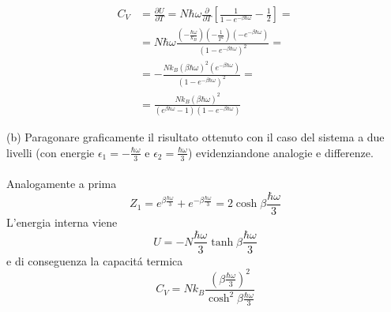 \documentclass[a4paper]{article}
\begin{document}
        \begin{equation*}
            \begin{split}
                C_V&=\frac{\partial U}{\partial T}=N\hbar\omega\frac{\partial}{\partial T}\left[\frac{1}{1-e^{-\beta\hbar\omega}}-\frac{1}{2}\right]=\\
                &=N\hbar\omega\frac{\left(-\frac{\hbar\omega}{k_B}\right)\left(-\frac{1}{T^2}\right)(-e^{-\beta\hbar\omega})}{(1-e^{-\beta\hbar\omega})^2}=\\
                &=-\frac{Nk_B(\beta\hbar\omega)^2(e^{-\beta\hbar\omega})}{(1-e^{-\beta\hbar\omega})^2}=\\
                &=\frac{Nk_B(\beta\hbar\omega)^2}{(e^{\beta\hbar\omega}-1)(1-e^{-\beta\hbar\omega})}
            \end{split}
        \end{equation*}
        \begin{center}
        \end{center}
        (b) Paragonare graficamente il risultato ottenuto con il caso del sistema a due livelli (con energie $\epsilon_1=-\frac{\hbar\omega}{3}$ e $\epsilon_2=\frac{\hbar\omega}{3}$) evidenziandone analogie e differenze.
        \\
        \\
        Analogamente a prima
        \begin{equation*}
            Z_1=e^{\beta\frac{\hbar\omega}{3}}+e^{-\beta\frac{\hbar\omega}{3}}=2\cosh\beta\frac{\hbar\omega}{3}
        \end{equation*}
        L'energia interna viene
        \begin{equation*}
            U=-N\frac{\hbar\omega}{3}\tanh\beta\frac{\hbar\omega}{3}
        \end{equation*}
        e di conseguenza la capacit\'a termica
        \begin{equation*}
            C_V=Nk_B\frac{\left(\beta\frac{\hbar\omega}{3}\right)^2}{\cosh^2\beta\frac{\hbar\omega}{3}}
        \end{equation*}
\end{document}
